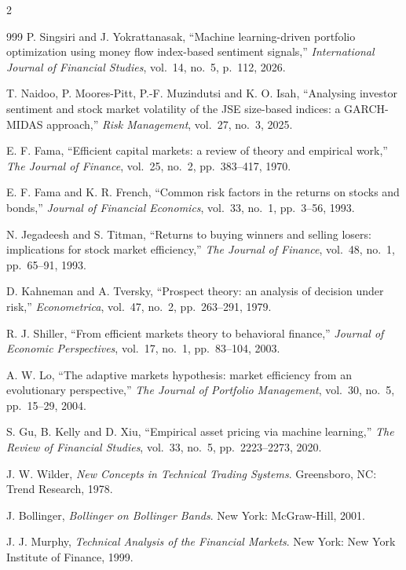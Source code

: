 \begin{footnotesize}
\begin{multicols}{2}
\begin{thebibliography}{999}
 P. Singsiri and J. Yokrattanasak, ``Machine learning-driven portfolio
optimization using money flow index-based sentiment signals,'' \emph{International Journal of
Financial Studies}, vol.~14, no.~5, p.~112, 2026.

 T. Naidoo, P. Moores-Pitt, P.-F. Muzindutsi and K. O. Isah, ``Analysing
investor sentiment and stock market volatility of the JSE size-based indices: a GARCH-MIDAS
approach,'' \emph{Risk Management}, vol.~27, no.~3, 2025.

 E. F. Fama, ``Efficient capital markets: a review of theory and empirical
work,'' \emph{The Journal of Finance}, vol.~25, no.~2, pp.~383--417, 1970.

 E. F. Fama and K. R. French, ``Common risk factors in the returns on
stocks and bonds,'' \emph{Journal of Financial Economics}, vol.~33, no.~1, pp.~3--56, 1993.

 N. Jegadeesh and S. Titman, ``Returns to buying winners and selling losers:
implications for stock market efficiency,'' \emph{The Journal of Finance}, vol.~48, no.~1,
pp.~65--91, 1993.

 D. Kahneman and A. Tversky, ``Prospect theory: an analysis of decision under
risk,'' \emph{Econometrica}, vol.~47, no.~2, pp.~263--291, 1979.

 R. J. Shiller, ``From efficient markets theory to behavioral finance,''
\emph{Journal of Economic Perspectives}, vol.~17, no.~1, pp.~83--104, 2003.

 A. W. Lo, ``The adaptive markets hypothesis: market efficiency from an
evolutionary perspective,'' \emph{The Journal of Portfolio Management}, vol.~30, no.~5,
pp.~15--29, 2004.

 S. Gu, B. Kelly and D. Xiu, ``Empirical asset pricing via machine learning,''
\emph{The Review of Financial Studies}, vol.~33, no.~5, pp.~2223--2273, 2020.

 J. W. Wilder, \emph{New Concepts in Technical Trading Systems}. Greensboro,
NC: Trend Research, 1978.

 J. Bollinger, \emph{Bollinger on Bollinger Bands}. New York: McGraw-Hill,
2001.

 J. J. Murphy, \emph{Technical Analysis of the Financial Markets}. New York:
New York Institute of Finance, 1999.


\end{thebibliography}
\end{multicols}
\end{footnotesize}
